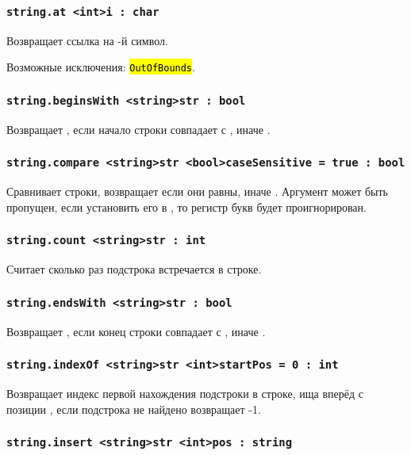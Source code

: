 \documentclass[a4paper, 14pt]{extarticle}
\newcommand{\ferror}[1]{{\fontsize{11pt}{12pt}\tt{\sethlcolor{yellow}\hl{#1}}}}
\begin{document}
\subsubsection{\lstinline|string.at <int>i : char|}

Возвращает ссылка на -й символ.

Возможные исключения: \ferror{OutOfBounds}.

\subsubsection{\lstinline|string.beginsWith <string>str : bool|}

Возвращает \true{}, если начало строки совпадает с , иначе \false{}.

\subsubsection{\lstinline|string.compare <string>str <bool>caseSensitive = true : bool|}

Сравнивает строки, возвращает \true{} если они равны, иначе \false{}. Аргумент  может быть пропущен, если установить его в \false{}, то регистр букв будет проигнорирован.

\subsubsection{\lstinline|string.count <string>str : int|}

Считает сколько раз подстрока  встречается в строке.

\subsubsection{\lstinline|string.endsWith <string>str : bool|}

Возвращает \true{}, если конец строки совпадает с , иначе \false{}.

\subsubsection{\lstinline|string.indexOf <string>str <int>startPos = 0 : int|}

Возвращает индекс первой нахождения подстроки  в строке, ища вперёд с позиции , если подстрока не найдено возвращает -1.

\subsubsection{\lstinline|string.insert <string>str <int>pos : string|}
\end{document}
